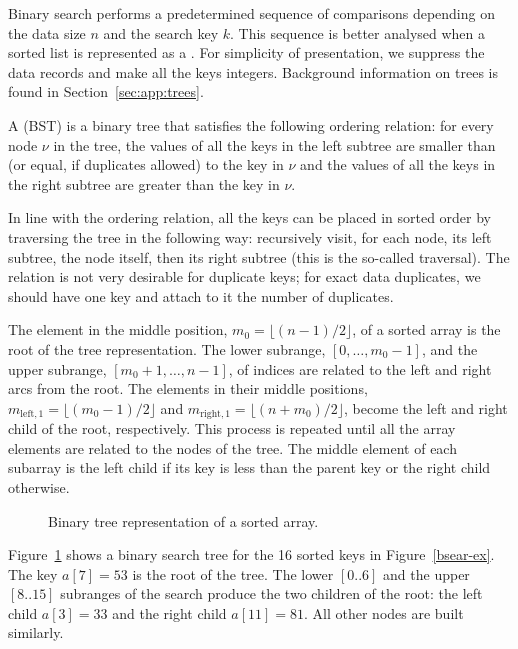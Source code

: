 Binary search performs a predetermined sequence of comparisons
depending on the data size $n$ and the search key $k$. This sequence
is better analysed when a sorted list is represented as a 
. For simplicity of presentation, we suppress 
the data records and make all the keys integers. Background information on trees
is found in Section~\ref{sec:app:trees}.

\begin{Definition}
A  (BST) is a binary tree that
satisfies the following ordering relation:
for every node $\nu$ in the tree, the values of all the keys
in the left subtree are smaller than (or equal, if duplicates allowed) 
to the key in $\nu$ and the  values of all the keys in the right 
subtree are greater than the key in $\nu$.
\end{Definition}

In line with the ordering relation, all the keys can be placed in sorted
order by traversing the tree in the following way: recursively visit,
for each node, its left subtree, the node itself, then its right subtree
(this is the so-called  traversal). The relation is
not very desirable for duplicate keys; for exact data duplicates, we
should have one key and attach to it the number of duplicates.

The element in the middle position, $m_{0}=\lfloor (n-1)/2\rfloor$, of a
sorted array is the root of the tree representation.  The lower subrange,
$[0,\ldots,m_{0}-1]$, and the upper subrange, $[m_{0}+1,\ldots,n-1]$,
of indices are related to the left and right arcs from the root.
The elements in their middle positions, $m_{\mathrm{left},1}=\lfloor
(m_{0}-1)/2 \rfloor$ and $m_{\mathrm{right},1}=\lfloor (n + m_{0})/2
\rfloor$, become the left and right child of the root, respectively. This process 
is repeated until all the array elements are
related to the nodes of the tree. The middle element of each subarray
is the left child if its key is less than the parent key or the right
child otherwise.

\begin{figure}[htb!]
\centerline{
}
\caption{\label{btree-ex} Binary tree representation of
a sorted array.}
\end{figure}
\begin{Example}
Figure~\ref{btree-ex}
shows a binary search tree for the 16 sorted keys in
Figure~\ref{bsear-ex}.
The key $a[7] =53$ is the root of
the tree. The lower $[0..6]$ and the upper $[8..15]$
subranges of the search produce the two children of the root:
the left child $a[3] =33$ and the right child
$a[11] =81$. All other nodes are built similarly.
\end{Example}

